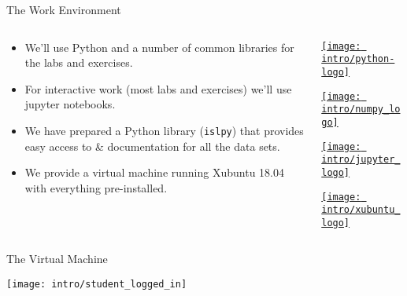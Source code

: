 \documentclass[mathserif, aspectratio=169]{beamer}
\begin{document}
\begin{frame}{The Work Environment}
	\begin{columns}
		\begin{column}{0.6\textwidth}
			\begin{itemize}
				\item We'll use Python and a number of common libraries
					for the labs and exercises.
				\item For interactive work (most labs and exercises) we'll use
					jupyter notebooks.
				\item We have prepared a Python library ({\tt islpy}) that provides
					easy access to \& documentation for all the data sets.
				\item We provide a virtual machine running Xubuntu 18.04 with everything
					pre-installed.
			\end{itemize}
		\end{column}
		\begin{column}{0.4\textwidth}
			\begin{center}
				\href{https://www.python.org/}{\texttt{[image: intro/python-logo]}}
			\end{center}
			\begin{center}
				\href{https://numpy.org/}{\texttt{[image: intro/numpy\_logo]}}
			\end{center}
			\begin{center}
				\href{https://jupyter.org/}{\texttt{[image: intro/jupyter\_logo]}}
			\end{center}
			\begin{center}
				\href{https://xubuntu.org/}{\texttt{[image: intro/xubuntu\_logo]}}
			\end{center}
		\end{column}
	\end{columns}
\end{frame}

\begin{frame}{The Virtual Machine}
	\begin{center}
		\texttt{[image: intro/student\_logged\_in]}
	\end{center}
\end{frame}
\end{document}
